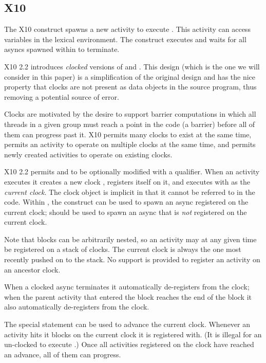 \subsection{X10}

The X10 construct  spawns a new activity to execute
. This activity can access variables in the lexical
environment. The construct  executes  and waits
for all asyncs spawned within  to terminate.

X10 2.2 introduces {\em clocked} versions of  and
. This design (which is the one we will consider in this
paper) is a simplification of the original design and has the nice
property that clocks are not present as data objects in the source
program, thus removing a potential source of error.

Clocks are motivated by the desire to support barrier computations in
which all threads in a given group must reach a point in the code (a
barrier) before all of them can progress past it. X10 permits many
clocks to exist at the same time, permits an activity to operate on
multiple clocks at the same time, and permits newly created activities
to operate on existing clocks.

X10 2.2 permits  and  to be optionally
modified with a  qualifier.  When an activity executes
 it creates a new clock , registers
itself on it, and executes  with  as the {\em
  current clock}.  The clock object is implicit in that it cannot be
referred to in the code.  Within , the 
construct can be used to spawn an async registered on the current
clock;  should be used to spawn an async that is {\em
  not} registered on the current clock.

Note that  blocks can be arbitrarily nested, so an
activity may at any given time be registered on a stack of clocks. The
current clock is always the one most recently pushed on to the stack.
No support is provided to register an activity on an ancestor
clock.

When a clocked async terminates it automatically de-registers from the
clock; when the parent activity that entered the 
block reaches the end of the block it also automatically de-registers
from the clock.

The special statement  can be used to advance the
current clock.  Whenever an activity hits  it blocks on
the current clock it is registered with. (It is illegal for an
un-clocked  to execute .) Once all
activities registered on the clock have reached an advance, all of
them can progress.

